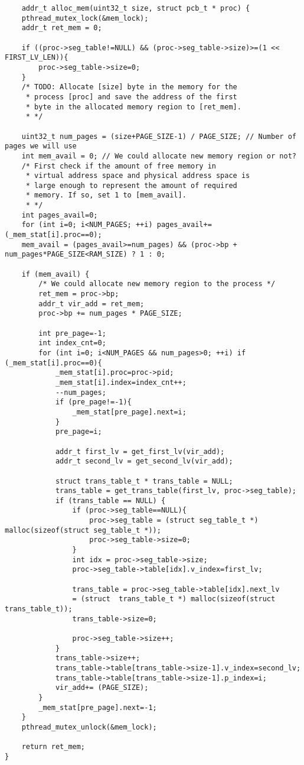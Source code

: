 \documentclass[10pt]{article}
\begin{document}
\begin{lstlisting}
    addr_t alloc_mem(uint32_t size, struct pcb_t * proc) {
    pthread_mutex_lock(&mem_lock);
    addr_t ret_mem = 0;

    if ((proc->seg_table!=NULL) && (proc->seg_table->size)>=(1 << FIRST_LV_LEN)){
        proc->seg_table->size=0;
    }
    /* TODO: Allocate [size] byte in the memory for the
     * process [proc] and save the address of the first
     * byte in the allocated memory region to [ret_mem].
     * */
    
    uint32_t num_pages = (size+PAGE_SIZE-1) / PAGE_SIZE; // Number of pages we will use
    int mem_avail = 0; // We could allocate new memory region or not?
    /* First check if the amount of free memory in
     * virtual address space and physical address space is
     * large enough to represent the amount of required 
     * memory. If so, set 1 to [mem_avail].
     * */
    int pages_avail=0;
    for (int i=0; i<NUM_PAGES; ++i) pages_avail+=(_mem_stat[i].proc==0);
    mem_avail = (pages_avail>=num_pages) && (proc->bp + num_pages*PAGE_SIZE<RAM_SIZE) ? 1 : 0;
    
    if (mem_avail) {
        /* We could allocate new memory region to the process */
        ret_mem = proc->bp;
        addr_t vir_add = ret_mem;
        proc->bp += num_pages * PAGE_SIZE;

        int pre_page=-1;
        int index_cnt=0;
        for (int i=0; i<NUM_PAGES && num_pages>0; ++i) if (_mem_stat[i].proc==0){
            _mem_stat[i].proc=proc->pid;
            _mem_stat[i].index=index_cnt++;
            --num_pages;
            if (pre_page!=-1){
                _mem_stat[pre_page].next=i;
            }
            pre_page=i;

            addr_t first_lv = get_first_lv(vir_add);
            addr_t second_lv = get_second_lv(vir_add);
    
            struct trans_table_t * trans_table = NULL;
            trans_table = get_trans_table(first_lv, proc->seg_table);
            if (trans_table == NULL) {
                if (proc->seg_table==NULL){
                    proc->seg_table = (struct seg_table_t *) malloc(sizeof(struct seg_table_t *));
                    proc->seg_table->size=0; 
                }
                int idx = proc->seg_table->size;
                proc->seg_table->table[idx].v_index=first_lv;
    
                trans_table = proc->seg_table->table[idx].next_lv
                = (struct  trans_table_t *) malloc(sizeof(struct  trans_table_t));
                trans_table->size=0;

                proc->seg_table->size++;
            }
            trans_table->size++;
            trans_table->table[trans_table->size-1].v_index=second_lv;
            trans_table->table[trans_table->size-1].p_index=i;
            vir_add+= (PAGE_SIZE);
        }
        _mem_stat[pre_page].next=-1;
    }
    pthread_mutex_unlock(&mem_lock);

    return ret_mem;
}

\end{lstlisting}
\end{document}

